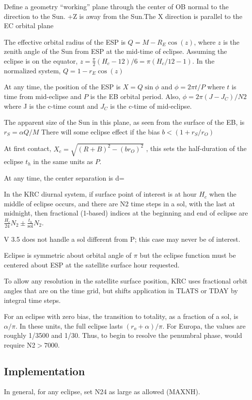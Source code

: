 \documentclass{article}
\begin{document}
Define a geometry ``working'' plane through the center of OB normal to the
direction to the Sun. +Z is away from the Sun.The X direction is parallel to the
EC orbital plane

The effective orbital radius of the ESP is $Q= M-R_E \cos(z)$, where $z$ is the
zenith angle of the Sun from ESP at the mid-time of eclipse. Assuming the
eclipse is on the equator, $z=\frac{ \pi}{2}(H_c-12)/6 = \pi(H_c/12 -1)$. In the
normalized system, $Q=1-r_E \cos(z)$

At any time, the position of the ESP is $X=Q \sin \phi $ and $\phi=2 \pi t/P $
where $t$ is time from mid-eclipse and $P$ is the EB orbital period.  Also,
$\phi=2 \pi (J-J_C)/N2 $ where J is the c-time count and $J_C$ is the c-time of
mid-eclipse.

The apparent size of the Sun in this plane, as seen from the surface of the EB,
is $r_S= \alpha Q/M $
There will some eclipse effect if the bias $b<(1+r_S/r_O)$

At first contact, $X_c=\sqrt{(R+B)^2-(br_O)^2} $ , this sets the half-duration
 of the eclipse $t_h$ in the same units as $P$.

At any time, the center separation is 
\qb d= \qe

In the KRC diurnal system, if surface point of interest is at hour $H_c$ when
the middle of eclipse occurs, and there are N2 time steps in a sol, with the
last at midnight, then fractional (1-based) indices at the beginning and end of
eclipse are $ \frac{H_c}{24} N_2 \pm \frac{t_h}{\mathrm{sol}} N_2$.

V 3.5 does not handle a sol different from P; this case may never be of interest.

Eclipse is symmetric about orbital angle of $\pi$ but the eclipse function must
be centered about ESP at the satellite surface hour requested.

To allow any resolution in the satellite surface position, KRC uses fractional
orbit angles that are on the time grid, but shifts application in TLATS or TDAY
by integral time steps.

For an eclipse with zero bias, the transition to totality, as a fraction of a
sol, is $\alpha /\pi$. In these units, the full eclipse lasts $(r_o
+\alpha)/\pi$. For Europa, the values are roughly 1/3500 and 1/30. Thus, to begin
to resolve the penumbral phase, would require N2$>7000$.


\subsection{Implementation}
In general, for any eclipse, set N24 as large as allowed (MAXNH).
\end{document}
